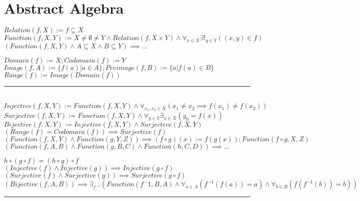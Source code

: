 \documentclass{book}
\newcommand{\wff}[1]{\hypertarget{#1}{\fbox{\textcolor{red}{$#1$}}\phantom{--}}}
\newcommand{\abr}{:=}
\begin{document}
\chapter{Abstract Algebra}
$Relation(f, X) \abr f \subseteq X$ \\
$Function(f, X, Y) \abr X \neq \emptyset \neq Y \land Relation(f, X \times Y) \land \forall_{x \in X} \exists!_{y \in Y}((x, y) \in f)$ \\

$(Function(f, X, Y) \land A \subseteq X \land B \subseteq Y) \implies \ldots$
\begin{enumerate}
  \lit $Domain(f) \abr X; Codomain(f) \abr Y$ %
  \lit $Image(f, A) \abr \{f(a) | a \in A\}; Preimage(f, B) \abr \{a | f(a) \in B\}$
  \lit $Range(f) \abr Image(Domain(f))$
\end{enumerate} \vspace{.75mm} \hrule \vspace{.75mm} \ \\ 

$Injective(f, X, Y) \abr Function(f, X, Y) \land \forall_{x_1, x_2 \in X}(x_1 \neq x_2 \implies f(x_1) \neq f(x_2))$ \\ %
$Surjective(f, X, Y) \abr Function(f, X, Y) \land \forall_{y \in Y} \exists_{x \in X}(y_0 = f(x))$ \\ %
$Bijective(f, X, Y) \abr Injective(f, X, Y) \land Surjective(f, X, Y)$ \\ %
\wff{Surjective Equivalent} $(Range(f) = Codomain(f)) \implies Surjective(f)$ \\

$(Function(f, X, Y) \land Function(g, Y, Z)) \implies (f \circ g)(x) \abr f(g(x)); Function(f \circ g, X, Z)$ \\

\wff{Properties of Functions} $(Function(f, A, B) \land Function(g, B, C) \land Function(h, C, D)) \implies \ldots$
\begin{enumerate}
  \lit $h \circ (g \circ f) = (h \circ g) \circ f$
  \lit $(Injective(f) \land Injective(g)) \implies Injective(g \circ f)$
  \lit $(Surjective(f) \land Surjective(g)) \implies Surjective(g \circ f)$
  \lit $(Bijective(f, A, B)) \implies \exists_{f^{-1}}(Function(f^-1, B, A) \land \forall_{a \in A}(f^{-1}(f(a)) = a) \land \forall_{b \in B}(f(f^{-1}(b)) = b))$
\end{enumerate} \vspace{.75mm} \hrule \vspace{.75mm} \ \\ 
\end{document}
